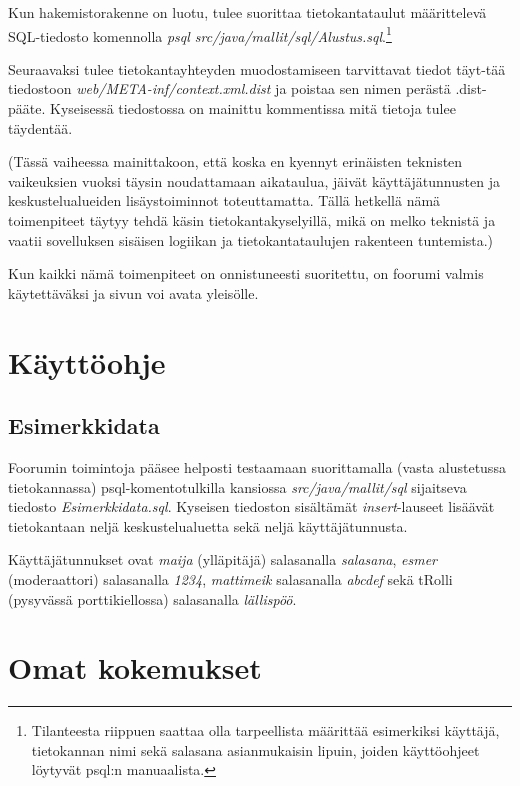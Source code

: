 \documentclass[11pt]{article}
\begin{document}
		Kun hakemistorakenne on luotu, tulee suorittaa tietokantataulut määrittelevä SQL-tiedosto komennolla
		\emph{psql src/java/mallit/sql/Alustus.sql}.\footnote{Tilanteesta riippuen saattaa olla
		tarpeellista määrittää esimerkiksi käyttäjä, tietokannan nimi sekä salasana asianmukaisin lipuin,
		joiden käyttöohjeet löytyvät psql:n manuaalista.}
		
		Seuraavaksi tulee tietokantayhteyden muodostamiseen tarvittavat tiedot täyt-tää tiedostoon
		\emph{web/META-inf/context.xml.dist} ja poistaa sen nimen perästä .dist-pääte. Kyseisessä tiedostossa
		on mainittu kommentissa mitä tietoja tulee täydentää. 
		
		(Tässä vaiheessa mainittakoon, että koska en kyennyt erinäisten teknisten vaikeuksien vuoksi täysin
		noudattamaan aikataulua, jäivät käyttäjätunnusten ja keskustelualueiden lisäystoiminnot toteuttamatta.
		Tällä hetkellä nämä toimenpiteet täytyy tehdä käsin tietokantakyselyillä, mikä on melko teknistä ja 
		vaatii sovelluksen sisäisen logiikan ja tietokantataulujen rakenteen tuntemista.)
		
		Kun kaikki nämä toimenpiteet on onnistuneesti suoritettu, on foorumi valmis käytettäväksi ja sivun
		voi avata yleisölle.
		
\newpage
\thispagestyle{plain}
	\section{Käyttöohje}
		\subsection{Esimerkkidata} Foorumin toimintoja pääsee helposti testaamaan suorittamalla (vasta
		alustetussa tietokannassa) psql-komentotulkilla kansiossa \emph{src/java/mallit/sql} sijaitseva
		tiedosto \emph{Esimerkkidata.sql}. Kyseisen tiedoston sisältämät \emph{insert}-lauseet lisäävät
		tietokantaan neljä keskustelualuetta sekä neljä käyttäjätunnusta.
		
		Käyttäjätunnukset ovat \emph{maija} (ylläpitäjä) salasanalla \emph{salasana}, \emph{esmer}
		(moderaattori) salasanalla \emph{1234}, \emph{mattimeik} salasanalla \emph{abcdef} sekä tRolli
		(pysyvässä porttikiellossa) salasanalla \emph{lällispöö}.
		
		
\newpage
\thispagestyle{plain}
	\section{Omat kokemukset}

	
\end{document}
